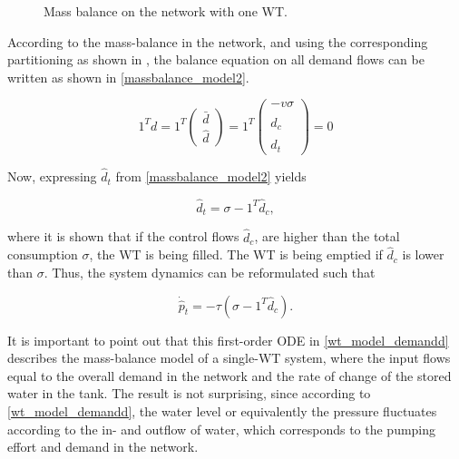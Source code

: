 \begin{figure}[H]
\centering
 
\caption{Mass balance on the network with one WT.}
\label{fig:onenode_system}
\end{figure}
\vspace{-3mm}

According to the mass-balance in the network, and using the corresponding partitioning as shown in , the balance equation on all demand flows can be written as shown in \eqref{massbalance_model2}.

\begin{equation}
\label{massbalance_model2}
1^Td 
 =
 1^T
\begin{pmatrix} 
\bar{d} \\
\hat{d}
\end{pmatrix}
=
1^T
\begin{pmatrix} 
-v \sigma \\
\hat{d}_c \\
\hat{d}_t 
\end{pmatrix}
=
0
\end{equation}

Now, expressing $\hat{d}_t $ from \eqref{massbalance_model2} yields

\begin{equation}
\label{massbalance_model2_1}
\hat{d}_t  = \sigma - 1^T \hat{d}_c,
\end{equation}

where it is shown that if the control flows $\hat{d}_c$, are higher than the total consumption $\sigma$, the WT is being filled. The WT is being emptied if $\hat{d}_c$ is lower than $\sigma$. Thus, the system dynamics can be reformulated such that

\begin{equation}
\label{wt_model_demandd}
\dot{\hat{p}}_t = -\tau (\sigma - 1^T \hat{d}_c).
\end{equation}

It is important to point out that this first-order ODE in \eqref{wt_model_demandd} describes the mass-balance model of a single-WT system, where the input flows equal to the overall demand in the network and the rate of change of the stored water in the tank. The result is not surprising, since according to \eqref{wt_model_demandd}, the water level or equivalently the pressure fluctuates according to the in- and outflow of water, which corresponds to the pumping effort and demand in the network. 

